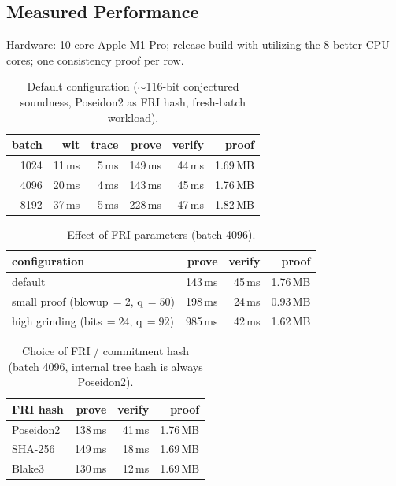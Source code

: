 \documentclass[twocolumn]{article}
\begin{document}
\subsection{Measured Performance}
\label{sec:measured}

Hardware: 10-core Apple M1 Pro; release build with utilizing the 8 better CPU cores; one consistency proof per row.

\begin{table}[ht]
\centering
\caption{Default configuration ($\sim$116-bit conjectured soundness, Poseidon2 as FRI hash, fresh-batch workload).}
\label{tab:perf-default}
\small
\begin{tabular}{r|rrrr|r}
\toprule
\textbf{batch} & \textbf{wit} & \textbf{trace} & \textbf{prove} & \textbf{verify} & \textbf{proof} \\
\midrule
1024 & 11\,ms & 5\,ms & 149\,ms & 44\,ms & 1.69\,MB \\
4096 & 20\,ms & 4\,ms & 143\,ms & 45\,ms & 1.76\,MB \\
8192 & 37\,ms & 5\,ms & 228\,ms & 47\,ms & 1.82\,MB \\
\bottomrule
\end{tabular}
\end{table}

\begin{table}[htb]
\centering
\caption{Effect of FRI parameters (batch 4096).}
\label{tab:perf-knobs}
\small
\begin{tabular}{l|rrr}
\toprule
\textbf{configuration} & \textbf{prove} & \textbf{verify} & \textbf{proof} \\
\midrule
default & 143\,ms & 45\,ms & 1.76\,MB \\
small proof (blowup\,$=2$, q\,$=50$) & 198\,ms & 24\,ms & 0.93\,MB \\
high grinding (bits\,$=24$, q\,$=92$) & 985\,ms & 42\,ms & 1.62\,MB \\
\bottomrule
\end{tabular}
\end{table}

\begin{table}[ht]
\centering
\caption{Choice of FRI / commitment hash (batch 4096, internal tree hash is always Poseidon2).}
\label{tab:perf-frihash}
\small
\begin{tabular}{l|rrr}
\toprule
\textbf{FRI hash} & \textbf{prove} & \textbf{verify} & \textbf{proof} \\
\midrule
Poseidon2 & 138\,ms & 41\,ms & 1.76\,MB \\
SHA-256   & 149\,ms & 18\,ms & 1.69\,MB \\
Blake3    & 130\,ms & 12\,ms & 1.69\,MB \\
\bottomrule
\end{tabular}
\end{table}
\end{document}
